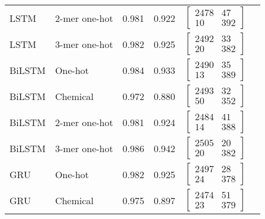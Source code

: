 \begin{longtable}{llllll}
    LSTM & 2-mer one-hot & 0.981 & 0.922 & 
	$\begin{bmatrix}
        2478 & 47\\ 
        10 & 392
    \end{bmatrix}$
    \\

    LSTM & 3-mer one-hot & 0.982 & 0.925 & 
	$\begin{bmatrix}
        2492 & 33\\ 
        20 & 382
    \end{bmatrix}$
    \\\midrule
    

    BiLSTM & One-hot & 0.984 & 0.933 &
    $\begin{bmatrix}
        2490 & 35\\ 
        13 & 389
    \end{bmatrix}$
    \\

    BiLSTM & Chemical & 0.972 & 0.880 &
    $\begin{bmatrix}
        2493 & 32\\ 
        50 & 352
    \end{bmatrix}$
    \\

    BiLSTM & 2-mer one-hot & 0.981 & 0.924 &
    $\begin{bmatrix}
        2484 & 41\\ 
        14 & 388
    \end{bmatrix}$
    \\

    BiLSTM & 3-mer one-hot & 0.986 & 0.942 &
    $\begin{bmatrix}
        2505 & 20\\ 
        20 & 382
    \end{bmatrix}$
    \\\midrule
            

    GRU & One-hot & 0.982 & 0.925 & 
	$\begin{bmatrix}
        2497 & 28\\ 
        24 & 378
    \end{bmatrix}$
    \\

    GRU & Chemical & 0.975 & 0.897 &
    $\begin{bmatrix}
        2474 & 51\\ 
        23 & 379
    \end{bmatrix}$
    \\


\end{longtable}
